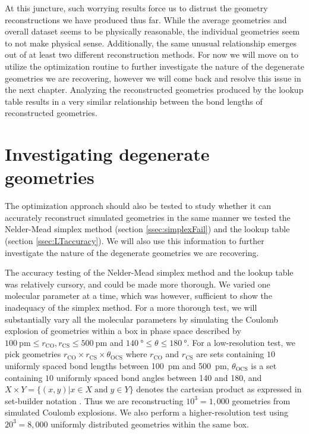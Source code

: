 At this juncture, such worrying results force us to distrust the geometry reconstructions we have produced thus far. While the average geometries and overall dataset seems to be physically reasonable, the individual geometries seem to not make physical sense. Additionally, the same unusual relationship emerges out of at least two different reconstruction methods. For now we will move on to utilize the optimization routine to further investigate the nature of the degenerate geometries we are recovering, however we will come back and resolve this issue in the next chapter. Analyzing the reconstructed geometries produced by the lookup table results in a very similar relationship between the bond lengths of reconstructed geometries.

\section{Investigating degenerate geometries} \label{sec:optimizationDegeneracies}
The optimization approach should also be tested to study whether it can accurately reconstruct simulated geometries in the same manner we tested the Nelder-Mead simplex method (section \ref{ssec:simplexFail}) and the lookup table (section \ref{ssec:LTaccuracy}). We will also use this information to further investigate the nature of the degenerate geometries we are recovering.

The accuracy testing of the Nelder-Mead simplex method and the lookup table was relatively cursory, and could be made more thorough. We varied one molecular parameter at a time, which was however, sufficient to show the inadequacy of the simplex method. For a more thorough test, we will substantially vary all the molecular parameters by simulating the Coulomb explosion of geometries within a box in phase space described by $\SI{100}{\pico\meter} \le r_\mathrm{CO}, r_\mathrm{CS} \le \SI{500}{\pico\meter}$ and $\SI{140}{\degree} \le \theta \le \SI{180}{\degree}$. For a low-resolution test, we pick geometries $r_\mathrm{CO} \times r_\mathrm{CS} \times \theta_\mathrm{OCS}$ where $r_\mathrm{CO}$ and $r_\mathrm{CS}$ are sets containing $10$ uniformly spaced bond lengths between \SI{100}{\pico\meter} and \SI{500}{\pico\meter}, $\theta_\mathrm{OCS}$ is a set containing $10$ uniformly spaced bond angles between \SI{140}{\deg} and \SI{180}{\deg}, and $X \times Y = \lbrace (x,y) | x \in X \;\mathrm{and}\; y \in Y \rbrace$ denotes the cartesian product as expressed in set-builder notation \citep[p. 6]{Warner90}. Thus we are reconstructing $10^3 = 1,000$ geometries from simulated Coulomb explosions. We also perform a higher-resolution test using $20^3 = 8,000$ uniformly distributed geometries within the same box.

